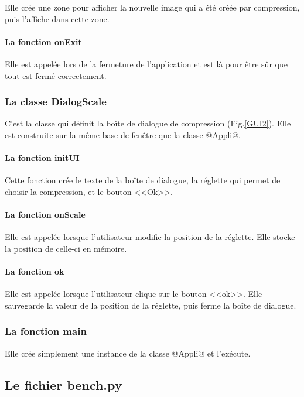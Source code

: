 \documentclass{article}
\begin{document}
Elle crée une zone pour afficher la nouvelle image qui a été créée par compression, puis l'affiche dans cette zone.

\paragraph{La fonction onExit}

Elle est appelée lors de la fermeture de l'application et est là pour être sûr que tout est fermé correctement.


\subsubsection{La classe DialogScale}

C'est la classe qui définit la boîte de dialogue de compression (Fig.\ref{GUI2}). Elle est construite sur la même base de fenêtre que la classe @Appli@.

\paragraph{La fonction initUI}

Cette fonction crée le texte de la boîte de dialogue, la réglette qui permet de choisir la compression, et le bouton <<Ok>>.

\paragraph{La fonction onScale}

Elle est appelée lorsque l'utilisateur modifie la position de la réglette. Elle stocke la position de celle-ci en mémoire. 

\paragraph{La fonction ok}

Elle est appelée lorsque l'utilisateur clique sur le bouton <<ok>>. Elle sauvegarde la valeur de la position de la réglette, puis ferme la boîte de dialogue.

\subsubsection{La fonction main}

Elle crée simplement une instance de la classe @Appli@ et l'exécute.


\subsection{Le fichier bench.py}
\end{document}
